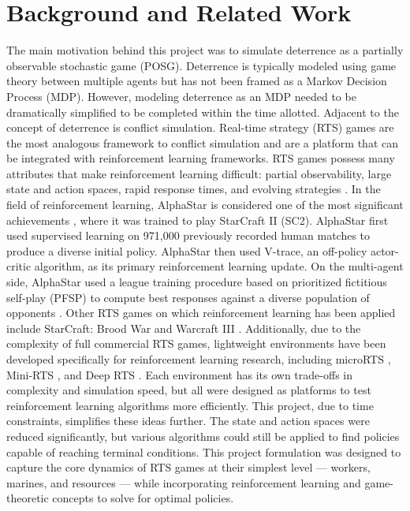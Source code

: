 \documentclass[conference]{IEEEtran}
\begin{document}
\section{Background and Related Work}
The main motivation behind this project was to simulate deterrence 
as a partially observable stochastic game (POSG). Deterrence is 
typically modeled using game theory between multiple agents but has 
not been framed as a Markov Decision Process (MDP). However, 
modeling deterrence as an MDP needed to be dramatically simplified 
to be completed within the time allotted. Adjacent to the concept 
of deterrence is conflict simulation. Real-time strategy (RTS) games 
are the most analogous framework to conflict simulation and are a platform that 
can be integrated with reinforcement learning frameworks. RTS games 
possess many attributes that make reinforcement learning difficult: 
partial observability, large state and action spaces, rapid response 
times, and evolving strategies
\cite{ontanon2013survey}. In the field of reinforcement learning, 
AlphaStar is considered one of the most significant achievements 
\cite{vinyals2019grandmaster}, where it was trained to play 
StarCraft II (SC2). AlphaStar first used supervised learning on 
971,000 previously recorded human matches to produce a diverse 
initial policy. AlphaStar then used V-trace, an off-policy 
actor-critic algorithm, as its primary reinforcement learning update. 
On the multi-agent side, AlphaStar used a league training procedure 
based on prioritized fictitious self-play (PFSP) to compute best 
responses against a diverse population of opponents 
\cite{vinyals2019grandmaster}. Other RTS games on which 
reinforcement learning has been applied include StarCraft: Brood War 
\cite{synnaeve2016torchcraft} and Warcraft III 
\cite{andersen2017tower}. Additionally, due to the complexity of 
full commercial RTS games, lightweight environments have been 
developed specifically for reinforcement learning research, including 
microRTS \cite{huang2021gym}, Mini-RTS \cite{tian2017elf}, and Deep 
RTS \cite{andersen2018deeprts}. Each environment has its own 
trade-offs in complexity and simulation speed, but all were designed 
as platforms to test reinforcement learning algorithms more 
efficiently. This project, due to time constraints, simplifies these 
ideas further. The state and action spaces were reduced 
significantly, but various algorithms could still be applied to find 
policies capable of reaching terminal conditions. This project 
formulation was designed to capture the core dynamics of RTS games 
at their simplest level --- workers, marines, and resources --- 
while incorporating reinforcement learning and game-theoretic 
concepts to solve for optimal policies.
\end{document}
